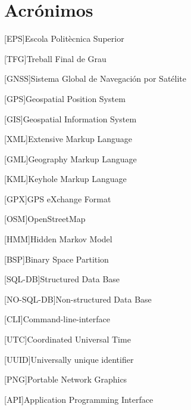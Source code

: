 \chapter{Acrónimos} %
%
%
\begin{acronym}

[EPS]{Escola Politècnica Superior}

[TFG]{Treball Final de Grau}

[GNSS]{Sistema Global de Navegación por Satélite}

[GPS]{Geospatial Position System}

[GIS]{Geospatial Information System}

[XML]{Extensive Markup Language}

[GML]{Geography Markup Language}

[KML]{Keyhole Markup Language}

[GPX]{GPS eXchange Format}

[OSM]{OpenStreetMap}

[HMM]{Hidden Markov Model}

[BSP]{Binary Space Partition}

[SQL-DB]{Structured Data Base}

[NO-SQL-DB]{Non-structured Data Base}

[CLI]{Command-line-interface}

[UTC]{Coordinated Universal Time}

[UUID]{Universally unique identifier}

[PNG]{Portable Network Graphics}

[API]{Application Programming Interface}

\end{acronym}
